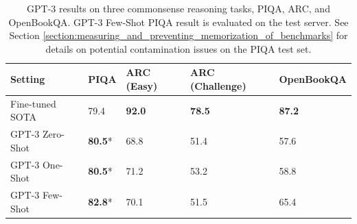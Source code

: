 
\begin{table}
    \centering
        \begin{tabular}{l l l l l}
        \toprule
        Setting & PIQA & ARC (Easy) & ARC (Challenge) & OpenBookQA \\ 
        \midrule
        Fine-tuned SOTA & 79.4 & \textbf{92.0}\cite{khashabi2020unifiedqa} & \textbf{78.5}\cite{khashabi2020unifiedqa}  & \textbf{87.2}\cite{khashabi2020unifiedqa}  \\ 
        GPT-3 Zero-Shot  & \textbf{80.5}* & 68.8 & 51.4 & 57.6 \\
        GPT-3 One-Shot & \textbf{80.5}* & 71.2 & 53.2 & 58.8 \\
        GPT-3 Few-Shot & \textbf{82.8}* & 70.1 & 51.5 &  65.4 \\
        \bottomrule
        \end{tabular}
    \caption{GPT-3 results on three commonsense reasoning tasks, PIQA, ARC, and OpenBookQA. GPT-3 Few-Shot PIQA result is evaluated on the test server.  See Section \ref{section:measuring_and_preventing_memorization_of_benchmarks} for details on potential contamination issues on the PIQA test set.}
    \label{table:reasoning}
\end{table}